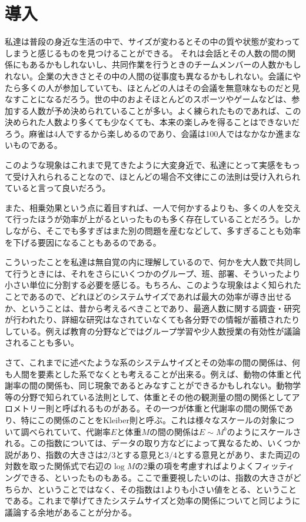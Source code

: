 \chapter{導入}

私達は普段の身近な生活の中で、サイズが変わるとその中の質や状態が変わってしまうと感じるものを見つけることができる。
それは会話とその人数の間の関係にもあるかもしれないし、共同作業を行うときのチームメンバーの人数かもしれない。企業の大きさとその中の人間の従事度も異なるかもしれない。会議にやたら多くの人が参加していても、ほとんどの人はその会議を無意味なものだと見なすことになるだろう。世の中のおよそほとんどのスポーツやゲームなどは、参加する人数が予め決められていることが多い。よく練られたものであれば、この決められた人数より多くても少なくても、本来の楽しみを得ることはできないだろう。麻雀は4人でするから楽しめるのであり、会議は100人ではなかなか進まないものである。

このような現象はこれまで見てきたように大変身近で、私達にとって実感をもって受け入れられることなので、ほとんどの場合不文律にこの法則は受け入れられていると言って良いだろう。

また、相乗効果という点に着目すれば、一人で何かするよりも、多くの人を交えて行ったほうが効率が上がるといったものも多く存在していることだろう。しかしながら、そこでも多すぎはまた別の問題を産むなどして、多すぎることも効率を下げる要因になることもあるのである。

こういったことを私達は無自覚の内に理解しているので、何かを大人数で共同して行うときには、それをさらにいくつかのグループ、班、部署、そういったより小さい単位に分割する必要を感じる。もちろん、このような現象はよく知られたことであるので、どれほどのシステムサイズであれば最大の効率が導き出せるか、ということは、昔から考えるべきことであり、最適人数に関する調査・研究が行われたり、詳細な研究はなされていなくても各分野での情報が蓄積されたりしている。例えば教育の分野などではグループ学習や少人数授業の有効性が議論されることも多い。

さて、これまでに述べたような系のシステムサイズとその効率の間の関係は、何も人間を要素とした系でなくとも考えることが出来る。例えば、動物の体重と代謝率の間の関係も、同じ現象であるとみなすことができるかもしれない。動物学等の分野で知られている法則として、体重とその他の観測量の間の関係としてアロメトリー則と呼ばれるものがある。その一つが体重と代謝率の間の関係であり、特にこの関係のことをKleiber則と呼ぶ。これは様々なスケールの対象について調べられていて、代謝率$E$と体重$M$の間の関係は$E\sim M^{b}$のようにスケールされる。この指数については、データの取り方などによって異なるため、いくつか説があり、指数の大きさは$2/3$とする意見と$3/4$とする意見とがあり、また両辺の対数を取った関係式で右辺の$\log M$の2乗の項を考慮すればよりよくフィッティングできる、といったものもある。ここで重要視したいのは、指数の大きさがどちらか、ということではなく、その指数は1よりも小さい値をとる、ということである。これまで挙げてきたシステムサイズと効率の関係についてと同じように議論する余地があることが分かる。

